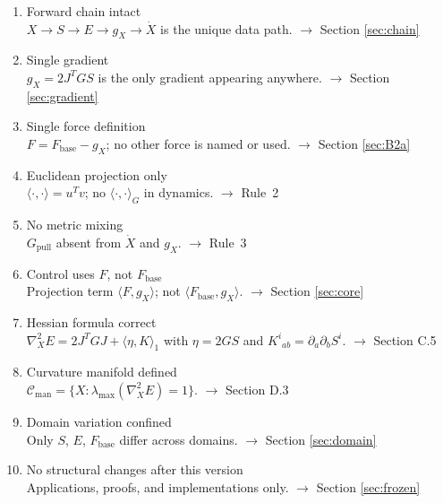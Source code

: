 \documentclass[11pt,oneside]{amsart}
\def\S{Section }%
\def\textbf#1{#1}%
\theoremstyle{plain}
\theoremstyle{definition}
\newcommand{\Xdot}{\dot{X}}
\newcommand{\gX}{g_X}
\newcommand{\Fbase}{F_{\mathrm{base}}}
\newcommand{\Gpull}{G_{\mathrm{pull}}}
\newcommand{\Cman}{\mathcal{C}_{\mathrm{man}}}
\begin{document}
\begin{checkbox}
\begin{enumerate}[leftmargin=2em, label=$\checkmark$\;\textbf{\arabic*.}]
  \item \textbf{Forward chain intact}\\
        $X \to S \to E \to \gX \to \Xdot$ is the unique data path.
        \hfill $\to$ \S \ref{sec:chain}

  \item \textbf{Single gradient}\\
        $\gX = 2J^{T}GS$ is the only gradient appearing anywhere.
        \hfill $\to$ \S \ref{sec:gradient}

  \item \textbf{Single force definition}\\
        $F = \Fbase - \gX$; no other force is named or used.
        \hfill $\to$ \S \ref{sec:B2a}

  \item \textbf{Euclidean projection only}\\
        $\langle \cdot,\cdot\rangle = u^{T}v$; no $\langle\cdot,\cdot\rangle_{G}$ in dynamics.
        \hfill $\to$ Rule~2

  \item \textbf{No metric mixing}\\
        $\Gpull$ absent from $\Xdot$ and $\gX$.
        \hfill $\to$ Rule~3

  \item \textbf{Control uses $F$, not $\Fbase$}\\
        Projection term $\langle F,\gX\rangle$; not $\langle\Fbase,\gX\rangle$.
        \hfill $\to$ \S \ref{sec:core}

  \item \textbf{Hessian formula correct}\\
        $\nabla^{2}_{X}E = 2 J^{T}GJ + \langle\eta,K\rangle_{1}$ with
        $\eta = 2GS$ and $K^{i}{}_{ab}=\partial_{a}\partial_{b}S^{i}$.
        \hfill $\to$ \S C.5

  \item \textbf{Curvature manifold defined}\\
        $\Cman = \{X : \lambda_{\max}(\nabla^{2}_{X}E) = 1\}$.
        \hfill $\to$ \S D.3

  \item \textbf{Domain variation confined}\\
        Only $S$, $E$, $\Fbase$ differ across domains.
        \hfill $\to$ \S \ref{sec:domain}

  \item \textbf{No structural changes after this version}\\
        Applications, proofs, and implementations only.
        \hfill $\to$ \S \ref{sec:frozen}
\end{enumerate}
\end{checkbox}
\end{document}
